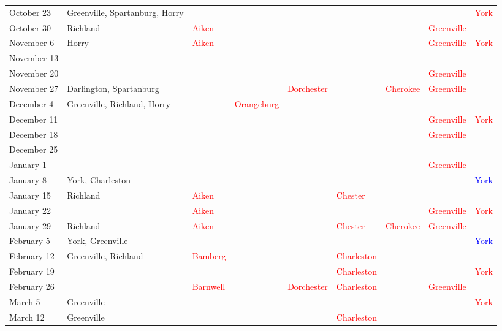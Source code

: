 \documentclass[11pt, oneside]{article}   	%
\theoremstyle{ModifiedStyle}
\begin{document}
\begin{table}[H]
{\begin{tabular}{L{23mm}C{55mm}C{16mm}C{20mm}C{16mm}C{15mm}C{15mm}C{26mm}C{8mm}}
			October 23 &  Greenville, Spartanburg, Horry & & & & & & &  \textcolor{red}{York} \\
			October 30 &  Richland & \textcolor{red}{Aiken} & & & & &  \textcolor{red}{Greenville} &\\
			November 6 &  Horry & \textcolor{red}{Aiken} & & & & &  \textcolor{red}{Greenville} &  \textcolor{red}{York} \\
			November 13 & & & & & & & &\\
			November 20 & & & & & & &  \textcolor{red}{Greenville} &\\
			November 27 &  Darlington, Spartanburg & & &  \textcolor{red}{Dorchester} & &  \textcolor{red}{Cherokee} &  \textcolor{red}{Greenville} &\\
			December 4 &  Greenville, Richland, Horry & & \textcolor{red}{Orangeburg} & & & & &\\
			December 11 & & & & & & &  \textcolor{red}{Greenville} &  \textcolor{red}{York} \\
			December 18 & & & & & & &  \textcolor{red}{Greenville} &\\
			December 25 & & & & & & & &\\
			January 1 & & & & & & &  \textcolor{red}{Greenville} &\\
			January 8 &  York, Charleston & & & & & & &  \textcolor{blue}{York} \\
			January 15 &  Richland & \textcolor{red}{Aiken} & & &  \textcolor{red}{Chester} & & &\\
			January 22 & & \textcolor{red}{Aiken} & & & & &  \textcolor{red}{Greenville} &  \textcolor{red}{York} \\
			January 29 &  Richland & \textcolor{red}{Aiken} & & &  \textcolor{red}{Chester} &  \textcolor{red}{Cherokee} &  \textcolor{red}{Greenville} &\\
			February 5 &  York, Greenville & & & & & & &  \textcolor{blue}{York} \\
			February 12 &  Greenville, Richland & \textcolor{red}{Bamberg} & & &  \textcolor{red}{Charleston} & & &\\
			February 19 & & & & &  \textcolor{red}{Charleston} & & &  \textcolor{red}{York} \\
			February 26 & & \textcolor{red}{Barnwell} & &  \textcolor{red}{Dorchester} &  \textcolor{red}{Charleston} & &  \textcolor{red}{Greenville} &\\
			March 5 &  Greenville & & & & & & &  \textcolor{red}{York} \\
			March 12 &  Greenville & & & &  \textcolor{red}{Charleston} & & &\\

\end{tabular}}
\end{table}
\end{document}
